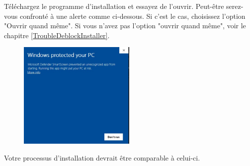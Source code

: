 \documentclass{article}
\begin{document}
Téléchargez le programme d'installation et essayez de l'ouvrir. Peut-être serez-vous confronté  à une alerte comme ci-dessous.  Si c'est le cas, choisissez l'option "Ouvrir quand même". Si vous n'avez pas l'option "ouvrir quand même", voir le chapitre \ref{TroubleDeblockInstaller}.
\begin{figure}[H]
\center
\includegraphics[width=0.5\textwidth]{Plots/OpeningWarning.jpeg}
\end{figure}
Votre processus d'installation devrait être comparable à celui-ci.
\end{document}
